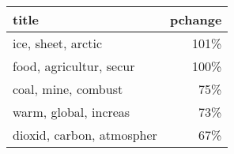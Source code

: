 \begin{tabular}{lr}
\toprule
                     title &  pchange \\
\midrule
        ice, sheet, arctic &     101\% \\
   food, agricultur, secur &     100\% \\
       coal, mine, combust &      75\% \\
     warm, global, increas &      73\% \\
 dioxid, carbon, atmospher &      67\% \\
\bottomrule
\end{tabular}
